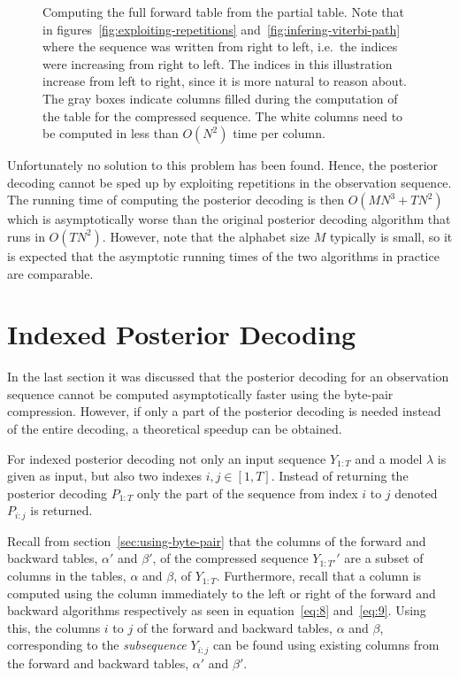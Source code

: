 \begin{figure}
  \centering
  
  \caption{Computing the full forward table from the partial table. Note that
    in figures~\ref{fig:exploiting-repetitions}
    and~\ref{fig:infering-viterbi-path} where the sequence was written from
    right to left, i.e.\ the indices were increasing from right to left. The
    indices in this illustration increase from left to right, since it is
    more natural to reason about. The gray boxes indicate columns filled during
    the computation of the table for the compressed sequence. The white columns
    need to be computed in less than $O(N^2)$ time per column.}
  \label{fig:full-forward-table}
\end{figure}

Unfortunately no solution to this problem has been found. Hence, the posterior
decoding cannot be sped up by exploiting repetitions in the observation
sequence. The running time of computing the posterior decoding is then
$O(M N^3 + TN^2)$ which is asymptotically worse than the original posterior
decoding algorithm that runs in $O(TN^2)$. However, note that the alphabet size
$M$ typically is small, so it is expected that the asymptotic running times of
the two algorithms in practice are comparable.

\section{Indexed Posterior Decoding}

In the last section it was discussed that the posterior decoding for an
observation sequence cannot be computed asymptotically faster using the byte-pair
compression. However, if only a part of the posterior decoding is needed
instead of the entire decoding, a theoretical speedup can be obtained.

For indexed posterior decoding not only an input sequence $Y_{1:T}$ and a model
$\lambda$ is given as input, but also two indexes $i,j \in [1,T]$. Instead of
returning the posterior decoding $P_{1:T}$ only the part of the sequence
from index $i$ to $j$ denoted $P_{i:j}$ is returned.

Recall from section~\ref{sec:using-byte-pair} that the columns of the forward
and backward tables, $\alpha'$ and $\beta'$, of the compressed sequence
$Y_{1:T'}'$ are a subset of columns in the tables, $\alpha$ and $\beta$, of
$Y_{1:T}$. Furthermore, recall that a column is computed using the column
immediately to the left or right of the forward and backward algorithms
respectively as seen in equation~\eqref{eq:8} and~\eqref{eq:9}. Using this, the
columns $i$ to $j$ of the forward and backward tables, $\alpha$ and $\beta$,
corresponding to the \emph{subsequence} $Y_{i:j}$ can be found using existing
columns from the forward and backward tables, $\alpha'$ and $\beta'$.

